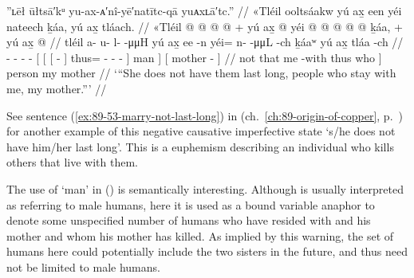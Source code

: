 \ex\label{ex:92-125-not-lasting-with-my-mother-around}%
%
\begingl
	\glpreamble	”ʟēł ūłtsā′kᵘ yu-ax-ᴀ′nî-yē′natītc-qā yuᴀxʟā′tc.” //
	\glpreamble	«\!Tléil ooltsáakw yú ax̱ een yéi nateech ḵáa, yú ax̱ tláach. //
	\gla	«\!Tléil  @ {} @ {} @ {} @ {} +
		{} yú {} {} ax̱  @ {} {}
			yéi @  @ {} @ {} @ {} @ {} {}
			ḵáa, {} +
		{} yú ax̱  @ {} {} //
	\glb	\pqp{}tléil a- u- l-  -μμH
		{} yú {} {} ax̱ ee -n {}
			yéi= n-  -μμL -ch {} {}
			ḵáaʷ {}
		{} yú ax̱ tláa -ch {} //
	\glc	\pqp{} - - -  -
		{}[  {}[ {}[   - {}]
			thus= -  - - \· {}]
			man {}]
		{}[   mother - {}] //
	\gld	\pqp{}not  {} {} {} {}
		{} that {} {} me {} -with {}
			thus  {} {} {} \·who {}]
			person {}
		{} my mother {} {} //
	\glft	‘“She does not have them last long, people who stay with me, my mother.”’
		//
\endgl
\xe

See sentence (\ref{ex:89-53-marry-not-last-long}) in  (ch.\ \ref{ch:89-origin-of-copper}, p.\ \pageref{ex:89-53-marry-not-last-long}) for another example of this negative causative imperfective state  ‘s/he does not have him/her last long’.
This is a euphemism describing an individual who kills others that live with them.

The use of  ‘man’ in (\lastx) is semantically interesting.
Although  is usually interpreted as referring to male humans, here it is used as a bound variable anaphor to denote some unspecified number of humans who have resided with  and his mother and whom his mother has killed.
As implied by this warning, the set of humans here could potentially include the two sisters in the future, and thus  need not be limited to male humans.


